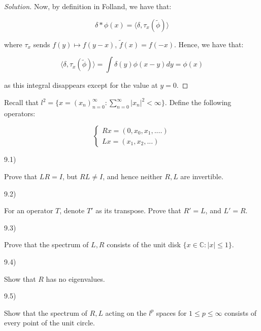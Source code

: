\documentclass[10pt]{article}
\newenvironment{problem}[2][]{\begin{trivlist}
\item[\hskip \labelsep {\bfseries #1}\hskip \labelsep {\bfseries #2.}]}{\end{trivlist}}
\begin{document}
\begin{proof}[Solution]
Now, by definition in Folland, we have that:

$$ \delta \ast \phi(x) = \langle \delta, \tau_x(\tilde{\phi}) \rangle$$

where $\tau_x$ sends $f(y) \mapsto f(y - x)$, $\tilde{f}(x) = f(-x)$. Hence, we have that:

$$ \langle \delta, \tau_x(\tilde{\phi}) \rangle = \int \delta(y) \phi(x - y) dy = \phi(x) $$

as this integral disappears except for the value at $y = 0$.

\end{proof}

\begin{problem}{Question 9}

Recall that $l^2 = \{ x = (x_n)_{n=0}^\infty : \sum_{n=0}^\infty |x_n|^2 < \infty \}$. Define the following operators:

$$\begin{cases} Rx = (0, x_0, x_1,....) \\ Lx = (x_1,x_2,...) \end{cases} $$

9.1)

Prove that $LR = I$, but $RL \not = I$, and hence neither $R, L$ are invertible.

9.2)

For an operator $T$, denote $T'$ as its transpose. Prove that $R' = L$, and $L' = R$.

9.3)

Prove that the spectrum of $L, R$ consists of the unit disk $ \{ x \in \mathbb{C} : |x| \leq 1 \}$.

9.4)

Show that $R$ has no eigenvalues.

9.5)

Show that the spectrum of $R, L$ acting on the $l^p$ spaces for $1 \leq p \leq \infty$ consists of every point of the unit circle. 

\end{problem}
\end{document}
